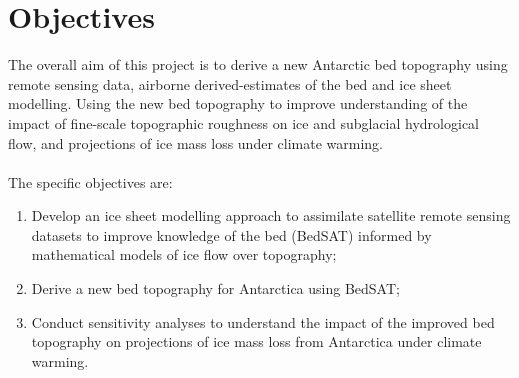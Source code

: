 \chapter{Objectives}

The overall aim of this project is to derive a new Antarctic bed topography using remote sensing data, airborne derived-estimates of the bed and ice sheet modelling. Using the new bed topography to improve understanding of the impact of fine-scale topographic roughness on ice and subglacial hydrological flow, and projections of ice mass loss under climate warming.\\
\\The specific objectives are:
\begin{enumerate}
    \item Develop an ice sheet modelling approach to assimilate satellite remote sensing datasets to improve knowledge of the bed (BedSAT) informed by mathematical models of ice flow over topography;
    \item Derive a new bed topography for Antarctica using BedSAT;
    \item Conduct sensitivity analyses to understand the impact of the improved bed topography on projections of ice mass loss from Antarctica under climate warming.
\end{enumerate}